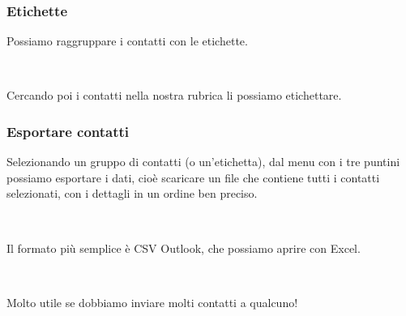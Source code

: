 \documentclass[]{beamer}
\begin{document}
\begin{frame}
\frametitle{Etichette}
Possiamo raggruppare i contatti con le etichette.\pause

~

Cercando poi i contatti nella nostra rubrica li possiamo etichettare.

\end{frame}



\begin{frame}
\frametitle{Esportare contatti}
Selezionando un gruppo di contatti (o un'etichetta), dal menu con i tre puntini possiamo esportare i dati, cioè \alert{scaricare un file} che contiene tutti i contatti selezionati, con i dettagli in un ordine ben preciso.\pause

~

Il formato più semplice è \alert{CSV Outlook}, che possiamo aprire con Excel.
\pause

~

Molto utile se dobbiamo inviare molti contatti a qualcuno!
\end{frame}
\end{document}
